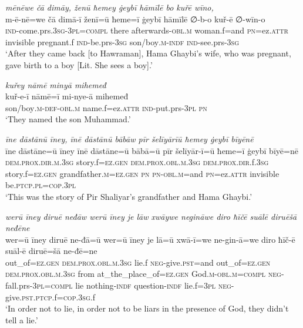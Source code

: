 \ea \label{BP.205}
\textit{mēnēwe čā dimāy, ženū ħemey ġeybī hāmīlē bo kuřē wīno,} \\ 
\gll m-ē-nē=we čā dimā-ī ženī=ū ħeme=ī ġeybī hāmīlē ∅-b-o kuř-ē ∅-wīn-o \\ 
 \textsc{ind-}come.prs\textsc{.3sg}\textsc{-3pl}\textsc{=compl} there afterwards\textsc{-obl}\textsc{.m} woman.f=and \textsc{pn}=ez.\textsc{attr} invisible pregnant.f \textsc{ind-}be.prs\textsc{-3sg} son/boy\textsc{.m}\textsc{-indf} \textsc{ind-}see.prs\textsc{-3sg} \\ 
\glt `After they came back [to Hawraman], Hama Ghaybi’s wife, who was pregnant, gave birth to a boy [Lit. She sees a boy].'
\z 
 
\ea \label{BP.206}
\textit{kuřey nāmē minyā mihemeđ} \\ 
\gll kuř-e-ī nāmē=ī mi-nye-ā mihemeđ \\ 
 son/boy\textsc{.m}\textsc{-def}\textsc{-obl}\textsc{.m} name.f=ez.\textsc{attr} \textsc{ind-}put.prs\textsc{-3pl} \textsc{pn} \\ 
\glt `They named the son Muhammad.'
\z 
 
\ea \label{BP.208}
\textit{īne dāstānū īney, īnē dāstānū bābāw pīr šelīyārīū ħemey ġeybī bīyēnē} \\ 
\gll īne dāstāne=ū īney īnē dāstāne=ū bābā=ū pīr šelīyār-ī=ū ħeme=ī ġeybī bīyē=nē \\ 
 \textsc{dem.prox}\textsc{.dir}\textsc{.m}\textsc{.3sg} story.f\textsc{=ez.gen} \textsc{dem.prox}\textsc{.obl}\textsc{.m}\textsc{.3sg} \textsc{dem.prox}\textsc{.dir}.f\textsc{.3sg} story.f\textsc{=ez.gen} grandfather\textsc{.m}\textsc{=ez.gen} \textsc{pn} \textsc{pn}\textsc{-obl}\textsc{.m}=and \textsc{pn}=ez.\textsc{attr} invisible be\textsc{.ptcp}\textsc{.pl}\textsc{=cop}\textsc{.3pl} \\ 
\glt `This was the story of Pir Shaliyar’s grandfather and Hama Ghaybi.'
\z 
 
\ea \label{BP.211}
\textit{werū īney diruē neđāw werū īney je lāw xwāywe negināwe diro ħīčē suālē diruēšā neđēne} \\ 
\gll wer=ū īney diruē ne-đā=ū wer=ū īney je lā=ū xwā-ī=we ne-gin-ā=we diro ħīč-ē suāl-ē diruē=šā ne-đē=ne \\ 
 out\_of\textsc{=ez.gen} \textsc{dem.prox}\textsc{.obl}\textsc{.m}\textsc{.3sg} lie.f \textsc{neg-}give\textsc{.pst}=and out\_of\textsc{=ez.gen} \textsc{dem.prox}\textsc{.obl}\textsc{.m}\textsc{.3sg} from at\_the\_place\_of\textsc{=ez.gen} God\textsc{.m}\textsc{-obl}\textsc{.m}\textsc{=compl} \textsc{neg-}fall.prs\textsc{-3pl}\textsc{=compl} lie nothing\textsc{-indf} question\textsc{-indf} lie.f\textsc{=3pl} \textsc{neg-}give\textsc{.pst}\textsc{.ptcp}.f\textsc{=cop}\textsc{.3sg}.f \\ 
\glt `In order not to lie, in order not to be liars in the presence of God, they didn’t tell a lie.'
\z 
 
